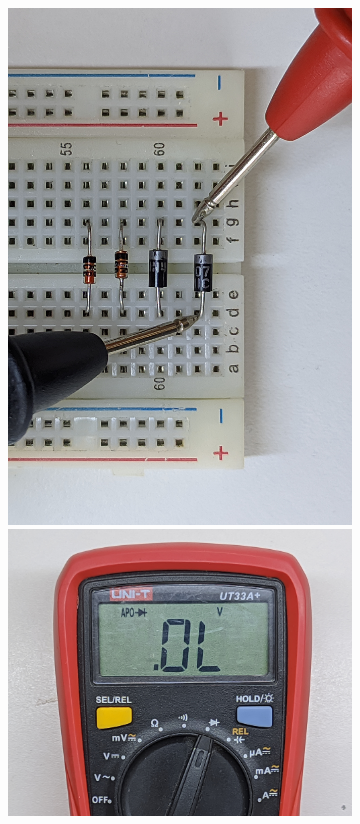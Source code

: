 \documentclass[chaptersright]{informeutn}
\begin{document}
\begin{figure}[!ht]
\begin{subfigure}[b]{1\textwidth}
\begin{minipage}[b]{0.24\textwidth}
          \includegraphics[angle=-90, width=1\textwidth]{pictures/prot_diod-1i.jpg}
          \includegraphics[width=1\textwidth]{pictures/mult_diod-i.jpg}

\end{minipage}
\end{subfigure}
\end{figure}
\end{document}

